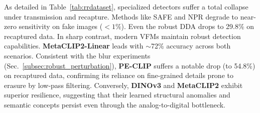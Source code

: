 \documentclass[sigconf,screen]{acmart}
\theoremstyle{plain}
\theoremstyle{definition}
\theoremstyle{remark}
\begin{document}
\begin{table}[t]
\centering
\caption{\textbf{Robustness Evaluation on RRDataset.} We report the accuracy on Real and AI classes separately.}
\label{tab:rrdataset}
\vspace{-10pt}
\end{table}

As detailed in Table~\ref{tab:rrdataset}, specialized detectors suffer a total collapse under transmission and recapture. Methods like SAFE and NPR degrade to near-zero sensitivity on fake images ($<1\%$). Even the robust DDA drops to 29.8\% on recaptured data.
In sharp contrast, modern VFMs maintain robust detection capabilities. \textbf{MetaCLIP2-Linear} leads with $\sim$72\% accuracy across both scenarios. Consistent with the blur experiments (Sec.~\ref{subsec:robust_perturbation}), \textbf{PE-CLIP} suffers a notable drop (to 54.8\%) on recaptured data, confirming its reliance on fine-grained details prone to erasure by low-pass filtering. Conversely, \textbf{DINOv3} and \textbf{MetaCLIP2} exhibit superior resilience, suggesting that their learned structural anomalies and semantic concepts persist even through the analog-to-digital bottleneck.
\end{document}

